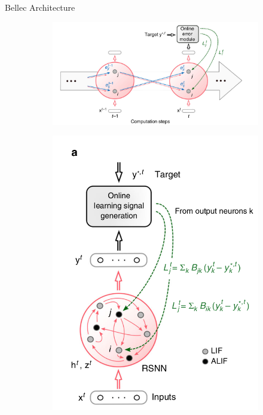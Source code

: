 \documentclass[t]{beamer}
\begin{document}
\begin{frame}{Bellec Architecture}
    \begin{figure}
    \centering
    \begin{subfigure}{.6\textwidth}
      \centering
      \includegraphics[width=\textwidth]{imgs/net.png}
    \end{subfigure}%
    \begin{subfigure}{.4\textwidth}
      \centering
      \includegraphics[width=.9\textwidth]{imgs/net2.png}
      \label{fig:sub2}
    \end{subfigure}
    \end{figure}
    
\end{frame}
\end{document}
